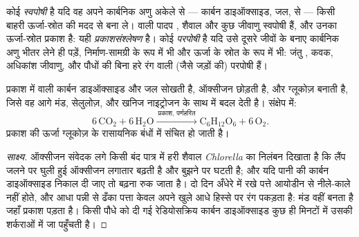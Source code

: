 \begin{definition}[स्वपोषण और परपोषण]\label{def:g10:cell-metabolism:autotrophy}
कोई  \emph{स्वपोषी} है यदि वह अपने कार्बनिक अणु
अकेले  से --- कार्बन डाइऑक्साइड, जल,  से --- किसी
बाहरी ऊर्जा-स्रोत की मदद से बना ले।  वाली पादप , शैवाल और
कुछ जीवाणु स्वपोषी हैं, और उनका ऊर्जा-स्रोत प्रकाश है: यही
\emph{प्रकाशसंश्लेषण} है। कोई 
\emph{परपोषी} है यदि उसे दूसरे जीवों के बनाए कार्बनिक अणु
भीतर लेने ही पड़ें, निर्माण-सामग्री के रूप में भी और ऊर्जा के स्रोत के
रूप में भी: जंतु , कवक, अधिकांश जीवाणु, और पौधों की बिना हरे रंग
वाली  (जैसे जड़ों की) परपोषी हैं।
\end{definition}

\begin{proposition}[प्रकाशसंश्लेषण]\label{prop:g10:cell-metabolism:photosynthesis}
प्रकाश में  वाली  कार्बन डाइऑक्साइड और जल सोखती है,
ऑक्सीजन छोड़ती है, और ग्लूकोज़ बनाती है, जिसे वह आगे मंड, सेलुलोज़,
 और खनिज नाइट्रोजन के साथ  में बदल देती है। संक्षेप
में:
\[
6\,\mathrm{CO_2} + 6\,\mathrm{H_2O} \xrightarrow{\ \text{प्रकाश, पर्णहरित}\ }
\mathrm{C_6H_{12}O_6} + 6\,\mathrm{O_2}.
\]
प्रकाश की ऊर्जा ग्लूकोज़ के रासायनिक बंधों में संचित हो जाती है।
\end{proposition}
\begin{proof}[साक्ष्य]
ऑक्सीजन संवेदक लगे किसी बंद पात्र में हरी शैवाल \emph{Chlorella} का
निलंबन दिखाता है कि लैंप जलने पर घुली हुई ऑक्सीजन लगातार बढ़ती है और
बुझने पर घटती है; और यदि पानी की कार्बन डाइऑक्साइड निकाल दी जाए तो बढ़ना
रुक जाता है। दो दिन अँधेरे में रखे पत्ते आयोडीन से नीले-काले नहीं होते,
और आधा पन्नी से ढँका पत्ता केवल अपने खुले आधे हिस्से पर रंग पकड़ता है:
मंड वहीं बनता है जहाँ प्रकाश पड़ता है। किसी पौधे को दी गई रेडियोसक्रिय
कार्बन डाइऑक्साइड कुछ ही मिनटों में उसकी शर्कराओं में जा पहुँचती है।
\end{proof}

